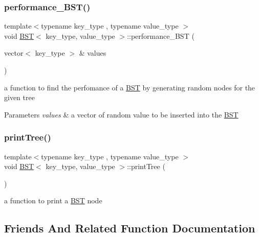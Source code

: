 \subsubsection{\texorpdfstring{performance\_BST()}{performance\_BST()}}
{\footnotesize\ttfamily template$<$typename key\+\_\+type , typename value\+\_\+type $>$ \\
void \mbox{\hyperlink{class_b_s_t}{B\+ST}}$<$ key\+\_\+type, value\+\_\+type $>$\+::performance\+\_\+\+B\+ST (\begin{DoxyParamCaption}\item[{vector$<$ key\+\_\+type $>$ \&}]{values }\end{DoxyParamCaption})}

a function to find the perfomance of a \mbox{\hyperlink{class_b_s_t}{B\+ST}} by generating random nodes for the given tree 
\begin{DoxyParams}{Parameters}
{\em values} & a vector of random value to be inserted into the \mbox{\hyperlink{class_b_s_t}{B\+ST}} \\
\hline
\end{DoxyParams}
\mbox{\label{class_b_s_t_a6891f10d9512637607be3783bc55ce2f}} 
\subsubsection{\texorpdfstring{printTree()}{printTree()}}
{\footnotesize\ttfamily template$<$typename key\+\_\+type , typename value\+\_\+type $>$ \\
void \mbox{\hyperlink{class_b_s_t}{B\+ST}}$<$ key\+\_\+type, value\+\_\+type $>$\+::print\+Tree (\begin{DoxyParamCaption}{ }\end{DoxyParamCaption})}

a function to print a \mbox{\hyperlink{class_b_s_t}{B\+ST}} node 

\subsection{Friends And Related Function Documentation}
\mbox{\label{class_b_s_t_a7785dba8dbfc8ef5e5f8f36bdd19fe58}} 
